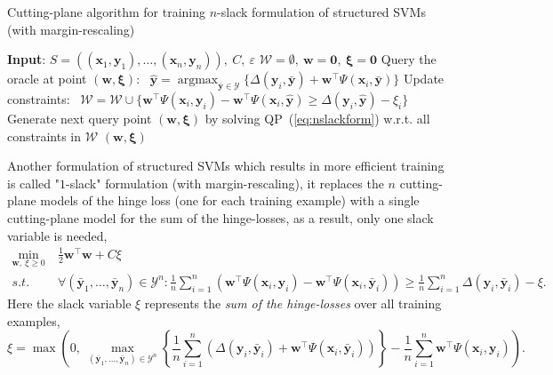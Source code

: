 \documentclass[9pt]{extarticle}
\DeclareMathOperator*{\argmax}{argmax}
\begin{document}
\begin{algorithm}[htbp]
\caption{Cutting-plane algorithm for training $n$-slack formulation of structured SVMs (with margin-rescaling)}
\label{alg:nslacktrain}
\begin{algorithmic}[1]
\STATE \textbf{Input}: $S = \left( (\mathbf{x}_1, \mathbf{y}_1), \dots, (\mathbf{x}_n, \mathbf{y}_n) \right),~ C,~ \varepsilon$
\STATE $\mathcal{W} = \emptyset,~ \mathbf{w} = \mathbf{0},~ \bm{\xi} = \mathbf{0}$
\REPEAT
        \STATE Query the oracle at point $(\mathbf{w}, \bm{\xi})$:~
               $\hat{\mathbf{y}} = \argmax_{\bar{\mathbf{y}} \in \mathcal{Y}} \{ \Delta(\mathbf{y}_i, \bar{\mathbf{y}}) + 
               \mathbf{w}^\top \Psi(\mathbf{x}_i, \bar{\mathbf{y}}) \}$
            \STATE Update constraints:~
                   $\mathcal{W} = \mathcal{W} \cup 
                    \{\mathbf{w}^\top \Psi(\mathbf{x}_i, \mathbf{y}_i) - \mathbf{w}^\top \Psi(\mathbf{x}_i, \hat{\mathbf{y}}) \ge 
                    \Delta(\mathbf{y}_i, \hat{\mathbf{y}}) - \xi_i \}$
            \STATE Generate next query point $(\mathbf{w}, \bm{\xi})$ by solving QP~(\ref{eq:nslackform}) w.r.t. all constraints in $\mathcal{W}$
        \ENDIF
    \ENDFOR
{}
\RETURN $(\mathbf{w}, \bm{\xi})$
\end{algorithmic}
\end{algorithm}


Another formulation of structured SVMs which results in more efficient training is called "$1$-slack" formulation (with margin-rescaling),
it replaces the $n$ cutting-plane models of the hinge loss (one for each training example) with a single cutting-plane model for 
the sum of the hinge-losses, as a result, only one slack variable is needed,
\begin{equation}
\label{eq:1slackform}
\begin{aligned}
\min_{\mathbf{w}, ~\xi \ge 0} ~& \frac{1}{2} \mathbf{w}^\top \mathbf{w} + C \xi \\
s.t.~~ ~& \forall(\bar{\mathbf{y}}_1, \dots, \bar{\mathbf{y}}_n) \in \mathcal{Y}^n: 
          \frac{1}{n} \sum_{i=1}^n 
          \left( \mathbf{w}^\top \Psi(\mathbf{x}_i, \mathbf{y}_i) - \mathbf{w}^\top \Psi(\mathbf{x}_i, \bar{\mathbf{y}}_i) \right) \ge
          \frac{1}{n} \sum_{i=1}^n \Delta(\mathbf{y}_i, \bar{\mathbf{y}}_i) - \xi.
\end{aligned}
\end{equation}
Here the slack variable $\xi$ represents the \emph{sum of the hinge-losses} over all training examples,
\begin{equation*}
\xi = \max \left( 0,~ 
      \max_{(\bar{\mathbf{y}}_1, \dots, \bar{\mathbf{y}}_n) \in \mathcal{Y}^n} 
      \left\{ 
      \frac{1}{n} \sum_{i=1}^n \left( \Delta(\mathbf{y}_i, \bar{\mathbf{y}}_i) + \mathbf{w}^\top \Psi(\mathbf{x}_i, \bar{\mathbf{y}}_i) \right)
      \right\} - \frac{1}{n} \sum_{i=1}^n \mathbf{w}^\top \Psi(\mathbf{x}_i, \mathbf{y}_i)
      \right).
\end{equation*}
\end{document}
